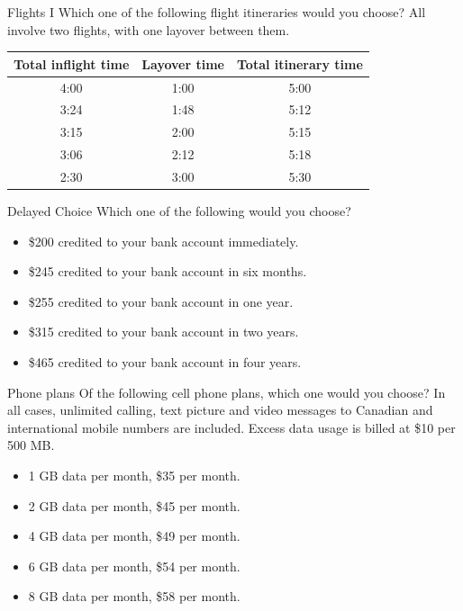 \documentclass{beamer}
\begin{document}
\begin{frame}{Flights I}
Which one of the following flight itineraries would you choose?
All involve two flights, with one layover between them.

\vspace{0.5cm}
\begin{center}
\begin{tabular}{ccc}
\hline
Total inflight time & Layover time & Total itinerary time \\ \hline
4:00 & 1:00 & 5:00 \\ 
3:24 & 1:48 & 5:12 \\ 
3:15 & 2:00 & 5:15 \\ 
3:06 & 2:12 & 5:18 \\ 
2:30 & 3:00 & 5:30 \\ \hline
\end{tabular}
\end{center}
\end{frame}

\begin{frame}{Delayed Choice}
Which one of the following would you choose?

\begin{itemize}
	\item \$200 credited to your bank account immediately.
	\item \$245 credited to your bank account in six months.
	\item \$255 credited to your bank account in one year.
	\item \$315 credited to your bank account in two years.
	\item \$465 credited to your bank account in four years.
\end{itemize}
\end{frame}

\begin{frame}{Phone plans}
Of the following cell phone plans, which one would you choose? In all cases, unlimited calling, text picture and video messages to Canadian and international mobile numbers are included. Excess data usage is billed at \$10 per 500 MB.

\begin{itemize}
	\item 1 GB data per month, \$35 per month.
	\item 2 GB data per month, \$45 per month.
	\item 4 GB data per month, \$49 per month.
	\item 6 GB data per month, \$54 per month.
	\item 8 GB data per month, \$58 per month.
\end{itemize}
\end{frame}
\end{document}
